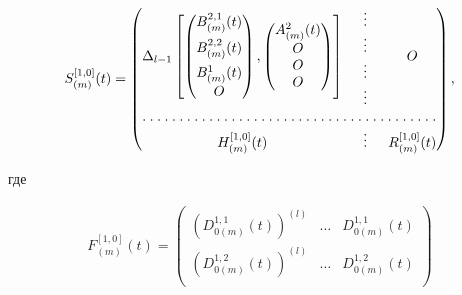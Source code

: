 \begin{pf}
\begin{gather*}
%


S_{(m)}^{[1,0]}(t)=


\begin{pmatrix}


\Delta_{l-1} \left[ 


\begin{pmatrix}


B_{(m)}^{2,1}(t) \\[2mm] B_{(m)}^{2,2}(t) \\[2mm]


B^1_{(m)}(t) \\ O 


\end{pmatrix},


\begin{pmatrix}


A_{(m)}^{2}(t) \\ O \\ O \\ O 


\end{pmatrix} \right] &


\begin{array}{c}


\vdots \\ \vdots \\ \vdots \\ \vdots


\end{array} & O\\


\hdotsfor[1.5]{3} \\


H_{(m)}^{[1,0]}(t) & \vdots & R_{(m)}^{[1,0]}(t)


\end{pmatrix},


\end{gather*}


где


\begin{gather*}




F_{(m)}^{[1,0]}(t)= 


\begin{pmatrix}


{(D_{0(m)}^{1,1}(t))}^{(l)} & \dotsc & D_{0(m)}^{1,1}(t)\\[2mm]


{(D_{0(m)}^{1,2}(t))}^{(l)} & \dotsc & D_{0(m)}^{1,2}(t)\\[2mm]



\end{pmatrix}
\end{gather*}
\end{pf}
